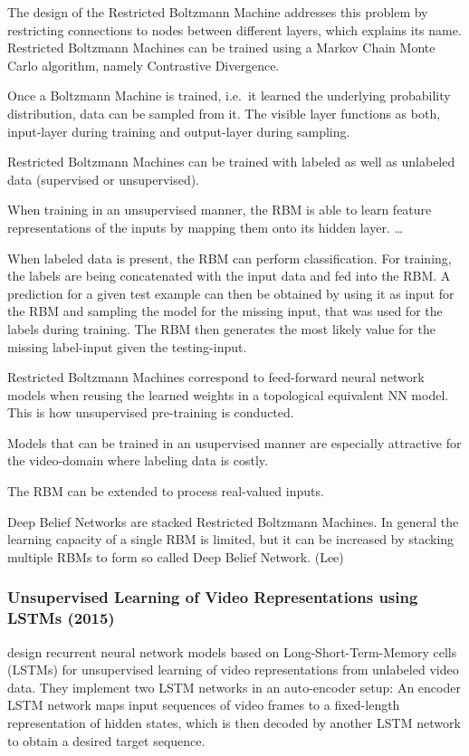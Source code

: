 The design of the Restricted Boltzmann Machine addresses this problem by restricting connections to nodes between different layers, which explains its name.
Restricted Boltzmann Machines can be trained using a Markov Chain Monte Carlo algorithm, namely Contrastive Divergence.

Once a Boltzmann Machine is trained, i.e.\ it learned the underlying probability distribution, data can be sampled from it.
The visible layer functions as both, input-layer during training and output-layer during sampling.

Restricted Boltzmann Machines can be trained with labeled as well as unlabeled data (supervised or unsupervised).

When training in an unsupervised manner, the RBM is able to learn feature representations of the inputs by mapping them onto its hidden layer.
\ldots

When labeled data is present, the RBM can perform classification. 
For training, the labels are being concatenated with the input data and fed into the RBM.
A prediction for a given test example can then be obtained by using it as input for the RBM and sampling the model for the missing input, that was used for the labels during training.
The RBM then generates the most likely value for the missing label-input given the testing-input.

Restricted Boltzmann Machines correspond to feed-forward neural network models when reusing the learned weights in a topological equivalent NN model.
This is how unsupervised pre-training is conducted.

Models that can be trained in an usupervised manner are especially attractive for the video-domain where labeling data is costly.

The RBM can be extended to process real-valued inputs.

Deep Belief Networks are stacked Restricted Boltzmann Machines.
In general the learning capacity of a single RBM is limited, but it can be increased by stacking multiple RBMs to form so called Deep Belief Network. (Lee)

\subsubsection{Unsupervised Learning of Video Representations using LSTMs (2015)}
\textcite{srivastava_unsupervised_2015} design recurrent neural network models based on Long-Short-Term-Memory cells (LSTMs) \cite{hochreiter_long_1997} for unsupervised learning of video representations from unlabeled video data.
They implement two LSTM networks in an auto-encoder setup: An encoder LSTM network maps input sequences of video frames to a fixed-length representation of hidden states, which is then decoded by another LSTM network to obtain a desired target sequence.

